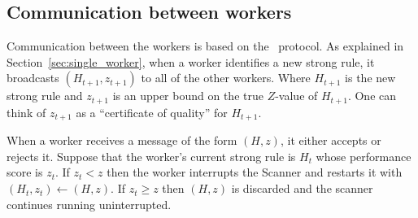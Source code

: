 \subsection{Communication between workers}
Communication between the workers is based on the \tmsn\ protocol.
As explained in Section~\ref{sec:single_worker}, when a worker
identifies a new strong rule, it broadcasts $(H_{t+1},z_{t+1})$ to all
of the other workers. Where $H_{t+1}$ is the new strong rule and
$z_{t+1}$ is an upper bound on the true $Z$-value of $H_{t+1}$. One
can think of $z_{t+1}$ as a ``certificate of quality'' for $H_{t+1}$.

When a worker receives a message of the form $(H,z)$,
it either accepts or rejects it. Suppose that the worker's current
strong rule is $H_t$ whose performance score is $z_t$. 
If  $z_t < z$ then the worker interrupts the Scanner and restarts it
with $(H_t,z_t) \gets (H,z)$.  If $z_t \geq z$ then $(H, z)$ is discarded
and the scanner continues running uninterrupted.

